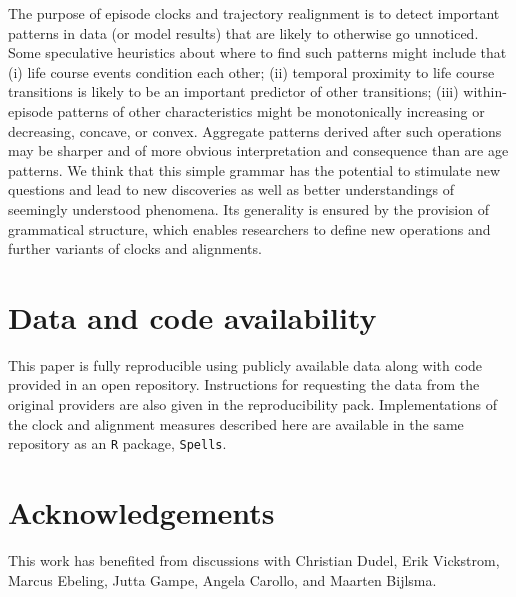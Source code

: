 \documentclass[a4paper,left=1.25cm,right=1.25cm,top=1.25cm,bottom=1.25cm]{article}
\begin{document}
The purpose of episode clocks and trajectory realignment is to detect important patterns in data (or model results) that are likely to otherwise go unnoticed. Some speculative heuristics about where to find such patterns might include that (i) life course events condition each other; (ii) temporal proximity to life course transitions is likely to be an important predictor of other transitions; (iii) within-episode patterns of other characteristics might be monotonically increasing or decreasing, concave, or convex. Aggregate patterns derived after such operations may be sharper and of more obvious interpretation and consequence than are age patterns. We think that this simple grammar has the potential to stimulate new questions and lead to new discoveries as well as better understandings of seemingly understood phenomena. Its generality is ensured by the provision of grammatical structure, which enables researchers to define new operations and further variants of clocks and alignments.

\section*{Data and code availability}
This paper is fully reproducible using publicly available data along with code provided in an open repository. Instructions for requesting the data from the original providers are also given in the reproducibility pack. Implementations of the clock and alignment measures described here are available in the same repository as an \texttt{R} package, \texttt{Spells}.

\section*{Acknowledgements}
This work has benefited from discussions with Christian Dudel, Erik Vickstrom, Marcus Ebeling, Jutta Gampe, Angela Carollo, and Maarten Bijlsma. 

\FloatBarrier
\singlespacing

   
\end{document}
